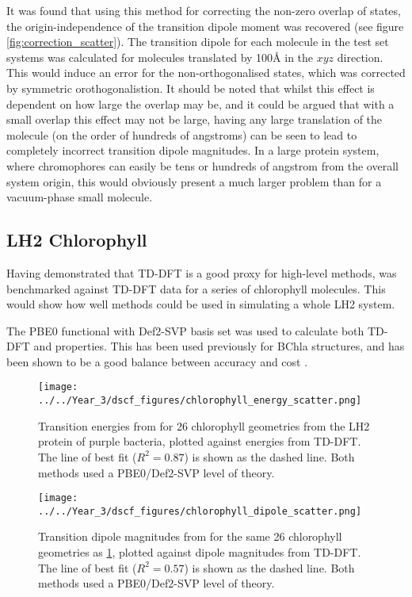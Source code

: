 It was found that using this method for correcting the non-zero overlap of states, 
the origin-independence of the transition dipole moment was recovered (see figure
\ref{fig:correction_scatter}).
The transition dipole for each molecule in the test set systems was calculated
for molecules translated by 100\AA{} in the $xyz$ direction.
This would induce an error for the non-orthogonalised states, which was corrected 
by symmetric orothogonalistion. It should be noted that whilst this effect is dependent
on how large the overlap may be, and it could be argued that with a small overlap 
this effect may not be large, having any large translation of the molecule (on the order of hundreds of angstroms) 
can be seen to lead to completely incorrect transition dipole magnitudes. In a
large protein system, where chromophores can easily be tens or hundreds of angstrom
from the overall system origin, this would obviously present a much larger problem 
than for a vacuum-phase small molecule.

\subsection{LH2 Chlorophyll}
\label{subsec:dscf_chl_tests}
Having demonstrated that TD-DFT is a good proxy for high-level methods, \dscf was
benchmarked against TD-DFT data for a series of chlorophyll molecules. This would
show how well \dscf methods could be used in simulating a whole LH2 system.

The PBE0 functional with Def2-SVP basis set \cite{Adamo1999, Schafer1992} was used
to calculate both TD-DFT and \dscf properties. This has been used previously for 
BChla structures, and has been shown to be a good balance between accuracy and cost 
\cite{Stross2016}. 

\begin{figure}
\centering
\texttt{[image: ../../Year\_3/dscf\_figures/chlorophyll\_energy\_scatter.png]}
\label{fig:chl_energy}
\caption{Transition energies from \dscf for 26 chlorophyll geometries from the LH2
protein of purple bacteria,  plotted against energies from TD-DFT. The line of
best fit ($R^2=0.87$) is shown as the dashed line. Both methods used a PBE0/Def2-SVP 
level of theory.}
\end{figure}

\begin{figure}
\centering
\texttt{[image: ../../Year\_3/dscf\_figures/chlorophyll\_dipole\_scatter.png]}
\caption{Transition dipole magnitudes from \dscf for the same 26 chlorophyll geometries as
\ref{fig:chl_energy}, plotted against dipole magnitudes from TD-DFT. The line of
best fit ($R^2= 0.57$) is shown as the dashed line. Both methods used a PBE0/Def2-SVP
level of theory.}
\label{fig:chl_dipole}
\end{figure}

